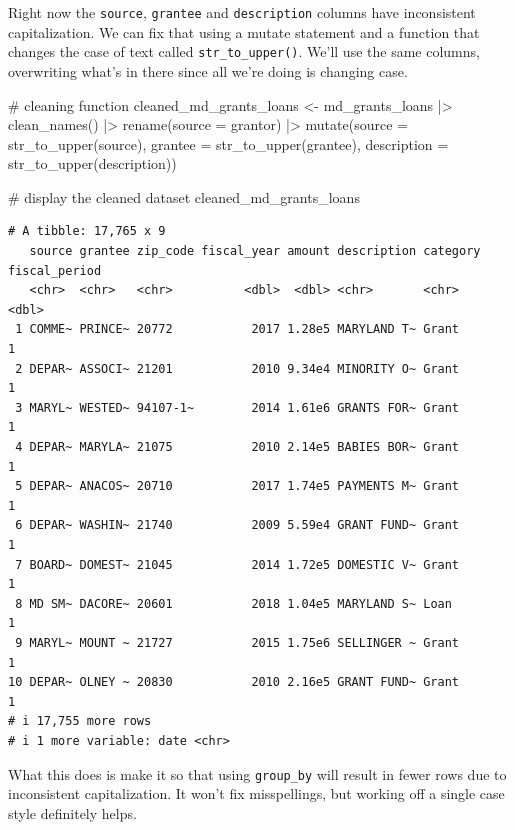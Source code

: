 \documentclass[
  letterpaper,
  DIV=11,
  numbers=noendperiod]{scrreprt}
\newenvironment{Shaded}{\begin{snugshade}}{\end{snugshade}}
\newcommand{\AttributeTok}[1]{\textcolor[rgb]{0.40,0.45,0.13}{#1}}
\newcommand{\CommentTok}[1]{\textcolor[rgb]{0.37,0.37,0.37}{#1}}
\newcommand{\FunctionTok}[1]{\textcolor[rgb]{0.28,0.35,0.67}{#1}}
\newcommand{\NormalTok}[1]{\textcolor[rgb]{0.00,0.23,0.31}{#1}}
\newcommand{\OtherTok}[1]{\textcolor[rgb]{0.00,0.23,0.31}{#1}}
\newcommand{\SpecialCharTok}[1]{\textcolor[rgb]{0.37,0.37,0.37}{#1}}
\begin{document}
Right now the \texttt{source}, \texttt{grantee} and \texttt{description}
columns have inconsistent capitalization. We can fix that using a mutate
statement and a function that changes the case of text called
\texttt{str\_to\_upper()}. We'll use the same columns, overwriting
what's in there since all we're doing is changing case.

\begin{Shaded}
\begin{Highlighting}[]
\CommentTok{\# cleaning function}
\NormalTok{cleaned\_md\_grants\_loans }\OtherTok{\textless{}{-}}\NormalTok{ md\_grants\_loans }\SpecialCharTok{|\textgreater{}}
  \FunctionTok{clean\_names}\NormalTok{() }\SpecialCharTok{|\textgreater{}} 
  \FunctionTok{rename}\NormalTok{(}\AttributeTok{source =}\NormalTok{ grantor) }\SpecialCharTok{|\textgreater{}} 
  \FunctionTok{mutate}\NormalTok{(}\AttributeTok{source =} \FunctionTok{str\_to\_upper}\NormalTok{(source), }\AttributeTok{grantee =} \FunctionTok{str\_to\_upper}\NormalTok{(grantee), }\AttributeTok{description =} \FunctionTok{str\_to\_upper}\NormalTok{(description))}

\CommentTok{\# display the cleaned dataset}
\NormalTok{cleaned\_md\_grants\_loans}
\end{Highlighting}
\end{Shaded}

\begin{verbatim}
# A tibble: 17,765 x 9
   source grantee zip_code fiscal_year amount description category fiscal_period
   <chr>  <chr>   <chr>          <dbl>  <dbl> <chr>       <chr>            <dbl>
 1 COMME~ PRINCE~ 20772           2017 1.28e5 MARYLAND T~ Grant                1
 2 DEPAR~ ASSOCI~ 21201           2010 9.34e4 MINORITY O~ Grant                1
 3 MARYL~ WESTED~ 94107-1~        2014 1.61e6 GRANTS FOR~ Grant                1
 4 DEPAR~ MARYLA~ 21075           2010 2.14e5 BABIES BOR~ Grant                1
 5 DEPAR~ ANACOS~ 20710           2017 1.74e5 PAYMENTS M~ Grant                1
 6 DEPAR~ WASHIN~ 21740           2009 5.59e4 GRANT FUND~ Grant                1
 7 BOARD~ DOMEST~ 21045           2014 1.72e5 DOMESTIC V~ Grant                1
 8 MD SM~ DACORE~ 20601           2018 1.04e5 MARYLAND S~ Loan                 1
 9 MARYL~ MOUNT ~ 21727           2015 1.75e6 SELLINGER ~ Grant                1
10 DEPAR~ OLNEY ~ 20830           2010 2.16e5 GRANT FUND~ Grant                1
# i 17,755 more rows
# i 1 more variable: date <chr>
\end{verbatim}

What this does is make it so that using \texttt{group\_by} will result
in fewer rows due to inconsistent capitalization. It won't fix
misspellings, but working off a single case style definitely helps.
\end{document}
